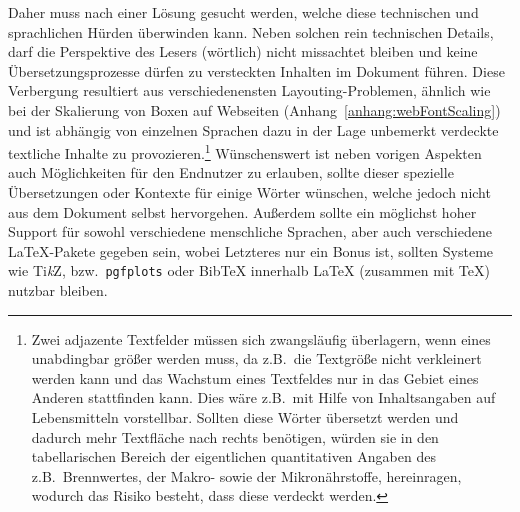 Daher muss nach einer Lösung gesucht werden, welche diese technischen und sprachlichen Hürden überwinden kann. Neben solchen rein technischen Details, darf die Perspektive des Lesers (wörtlich) nicht missachtet bleiben und keine Übersetzungsprozesse dürfen zu versteckten Inhalten im Dokument führen. Diese Verbergung resultiert aus verschiedenensten Layouting-Problemen, ähnlich wie bei der Skalierung von Boxen auf Webseiten (Anhang~\ref{anhang:webFontScaling}) und ist abhängig von einzelnen Sprachen dazu in der Lage unbemerkt verdeckte textliche Inhalte zu provozieren.\footnote{Zwei adjazente Textfelder müssen sich zwangsläufig überlagern, wenn eines unabdingbar größer werden muss, da z.B.\ die Textgröße nicht verkleinert werden kann und das Wachstum eines Textfeldes nur in das Gebiet eines Anderen stattfinden kann. Dies wäre z.B.\ mit Hilfe von Inhaltsangaben auf Lebensmitteln vorstellbar. Sollten diese Wörter übersetzt werden und dadurch mehr Textfläche nach rechts benötigen, würden sie in den tabellarischen Bereich der eigentlichen quantitativen Angaben des z.B.\ Brennwertes, der Makro- sowie der Mikronährstoffe, hereinragen, wodurch das Risiko besteht, dass diese verdeckt werden.}%
Wünschenswert ist neben vorigen Aspekten auch Möglichkeiten für den Endnutzer zu erlauben, sollte dieser spezielle Übersetzungen oder Kontexte für einige Wörter wünschen, welche jedoch nicht aus dem Dokument selbst hervorgehen. %
Außerdem sollte ein möglichst hoher Support für sowohl verschiedene menschliche Sprachen, aber auch verschiedene \LaTeX{}-Pakete gegeben sein, wobei Letzteres nur ein Bonus ist, sollten Systeme wie Ti\textit{k}Z, bzw.\ \texttt{pgfplots} oder Bib\TeX{} innerhalb \LaTeX{} (zusammen mit \TeX{}) nutzbar bleiben.%
